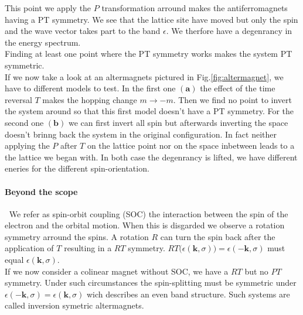 \documentclass[../main.tex]{main.tex}
\begin{document}
This point we apply the $P$ transformation arround makes the antiferromagnets having a PT symmetry. We see that the lattice site have moved but only the spin and
the wave vector takes part to the band $\epsilon$. We therfore have a degenrancy in the energy spectrum.\\
Finding at least one point where the PT symmetry works makes the system PT symmetric.\\

If we now take a look at an altermagnets pictured in Fig.\ref{fig:altermagnet}, we have to different models to test. In the first one $\bm{(a)}$
the effect of the time reversal $T$ makes the hopping change $m\rightarrow -m$. Then we find no point
to invert the system around so that this first model doesn't have a PT symmetry. For the second one $\bm{(b)}$
we can first invert all spin but afterwards inverting the space doesn't brinng back the system in the original configuration.
In fact neither applying the $P$ after $T$ on the lattice point nor on the space inbetween leads to a the lattice we began with. In both case the 
degenrancy is lifted, we have different eneries for the different spin-orientation.\\

\paragraph{Beyond the scope} $~$ We refer as spin-orbit coupling (SOC) the interaction between the spin of the electron and the orbital motion. 
When this is disgarded we observe a rotation symmetry arround the spins. A rotation $R$ can turn the spin back after the application of $T$
resulting in a $RT$ symmetry. $RT\bigl(\epsilon(\bm{k},\sigma)\bigr) = \epsilon(-\bm{k},\sigma)$ must equal $\epsilon(\bm{k},\sigma)$.\\

If we now consider a colinear magnet without SOC, we have a $RT$ but no $PT$ symmetry. Under such circumstances the spin-splitting must be symmetric under 
$\epsilon(-\bm{k},\sigma) = \epsilon(\bm{k},\sigma)$ wich describes an even band structure. Such systems are called inversion symetric altermagnets.\\
\end{document}
